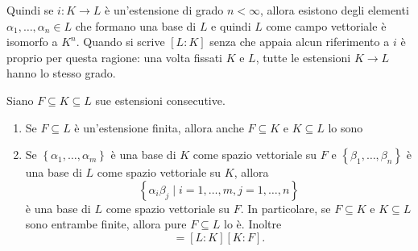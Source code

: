 
Quindi se \(i : K \to L\) è un'estensione di grado \(n < \infty\), allora esistono degli elementi \(\alpha_1, \dots{}, \alpha_n \in L\) che formano una base di \(L\) e quindi \(L\) come campo vettoriale è isomorfo a \(K^n\). Quando si scrive \([L:K]\) senza che appaia alcun riferimento a \(i\) è proprio per questa ragione: una volta fissati \(K\) e \(L\), tutte le estensioni \(K \to L\) hanno lo stesso grado.


\begin{prop}
Siano \(F\subseteq K\subseteq L\) sue estensioni consecutive. 
\begin{enumerate}
\item Se \(F\subseteq L\) è un'estensione finita, allora anche \(F \subseteq K\) e \(K\subseteq L\) lo sono
\item Se \(\left\{\alpha_1, \dots{}, \alpha_m\right\}\) è una base di \(K\) come spazio vettoriale su \(F\) e \(\left\{\beta_1, \dots{}, \beta_n\right\}\) è una base di \(L\) come spazio vettoriale su \(K\), allora
\[\left\{\alpha_i \beta_j \mid i = 1, \dots{}, m, j = 1,\dots{}, n \right\}\]
è una base di \(L\) come spazio vettoriale su \(F\). In particolare, se \(F \subseteq K\) e \(K\subseteq L\) sono entrambe finite, allora pure \(F \subseteq L\) lo è. Inoltre 
\begin{equation}
[L:F]=[L:K][K:F] .\label{form:GradoDiComposizioneEstensioni}
\end{equation}
\end{enumerate}
\end{prop}


